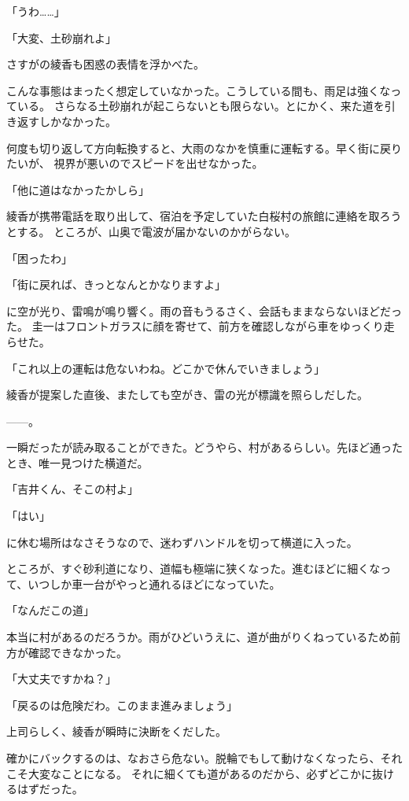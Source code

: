 ﻿\documentclass[
    book,tate,
    line_length=30zw,
    jafontsize=12pt,
    paper=b5j,
    landscape,
    ]{jlreq}
\begin{document}
「うわ……」

「大変、土砂崩れよ」

さすがの綾香も困惑の表情を浮かべた。

こんな事態はまったく想定していなかった。こうしている間も、雨足は強くなっている。
さらなる土砂崩れが起こらないとも限らない。とにかく、来た道を引き返すしかなかった。

何度も切り返して方向転換すると、大雨のなかを慎重に運転する。早く街に戻りたいが、
視界が悪いのでスピードを出せなかった。

「他に道はなかったかしら」

綾香が携帯電話を取り出して、宿泊を予定していた白桜村の旅館に連絡を取ろうとする。
ところが、山奥で電波が届かないのかがらない。

「困ったわ」

「街に戻れば、きっとなんとかなりますよ」

に空が光り、雷鳴が鳴り響く。雨の音もうるさく、会話もままならないほどだった。
圭一はフロントガラスに顔を寄せて、前方を確認しながら車をゆっくり走らせた。

「これ以上の運転は危ないわね。どこかで休んでいきましょう」

綾香が提案した直後、またしても空がき、雷の光が標識を照らしだした。

------。

一瞬だったが読み取ることができた。どうやら、村があるらしい。先ほど通ったとき、唯一見つけた横道だ。

「吉井くん、そこの村よ」

「はい」

に休む場所はなさそうなので、迷わずハンドルを切って横道に入った。

ところが、すぐ砂利道になり、道幅も極端に狭くなった。進むほどに細くなって、いつしか車一台がやっと通れるほどになっていた。

「なんだこの道」

本当に村があるのだろうか。雨がひどいうえに、道が曲がりくねっているため前方が確認できなかった。

「大丈夫ですかね？」

「戻るのは危険だわ。このまま進みましょう」

上司らしく、綾香が瞬時に決断をくだした。

確かにバックするのは、なおさら危ない。脱輪でもして動けなくなったら、それこそ大変なことになる。
それに細くても道があるのだから、必ずどこかに抜けるはずだった。
\end{document}

